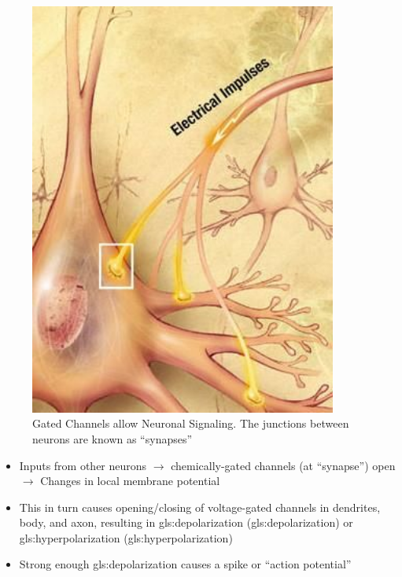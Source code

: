 \documentclass[]{article}
\begin{document}
\begin{figure}[H]
	\caption[Gated Channels allow Neuronal Signaling]{Gated Channels allow Neuronal Signaling. The junctions between neurons are known as ``synapses''}\label{fig:signalling}
	\includegraphics[width=0.9\textwidth]{signalling}
\end{figure}

\begin{itemize}
	\item Inputs from other neurons $\rightarrow$ 	chemically-gated channels (at
	``synapse'') open  $\rightarrow$ Changes in local membrane potential
	\item This in turn causes opening/closing 	of voltage-gated channels in 	dendrites, body, and axon, resulting in \gls{gls:depolarization} (\glsdesc{gls:depolarization}) or \gls{gls:hyperpolarization}	(\glsdesc{gls:hyperpolarization})
	\item Strong enough \gls{gls:depolarization}	causes a spike or “action potential”
\end{itemize}
\end{document}
